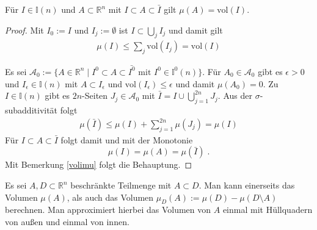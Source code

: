 \begin{Satz}
Für $I \in \mathbb{I}(n)$  und $A \subset \mathbb{R}^n$ mit $I \subset A \subset \bar{I}$ gilt $\mu (A) = \text{vol}(I)$.
\end{Satz}
\begin{proof}
Mit $I_0:=  I$ und $I_j := \emptyset$ ist $I \subset \bigcup_j I_j$ und damit gilt 
\begin{align*}
\mu(I) \leq \sum_j \text{vol}(I_j) = \text{vol}(I)
\end{align*}

Es sei $\mathcal{A}_0 := \{ A  \in \mathbb{R}^n  \; | \;  I^0 \subset A \subset \bar{I^0}  \text{  mit } I^0 \in \mathbb{I}^0(n) \}$. Für $A_0 \in \mathcal{A}_0$ gibt es 
$\epsilon > 0$ und $I_{\epsilon} \in \mathbb{I}(n)$ mit $A \subset I_{\epsilon}$ und $\text{vol} (I_{\epsilon})  \leq \epsilon$ und damit $\mu(A_0) = 0$.
Zu $I \in \mathbb{I}(n)$ gibt es $2n$-Seiten $J_j \in \mathcal{A}_0$ mit 
$\bar{I} = I \cup \bigcup_{j= 1}^{2n} J_j$. Aus der $\sigma$-subadditivität folgt
\begin{align*}
\mu(\bar{I})  \leq \mu(I) + \sum_{j=1}^{2n} \mu(J_j) = \mu (I)
\end{align*}
 Für $I \subset A \subset \bar{I}$ folgt damit und mit der Monotonie
$$ \mu(I) = \mu(A) = \mu(\bar{I}) \;. $$
Mit Bemerkung \ref{volimu} folgt die Behauptung.

\end{proof}


Es sei $A, D \subset \mathbb{R}^n$  beschränkte Teilmenge mit $A \subset D$.  
Man kann einerseits das Volumen $\mu(A)$, als auch das Volumen 
$\mu_D(A) :=  \mu(D) - \mu(D  \setminus  A)$ berechnen. Man approximiert hierbei das Volumen von $A$ einmal mit Hüllquadern von außen und einmal von innen.
 
